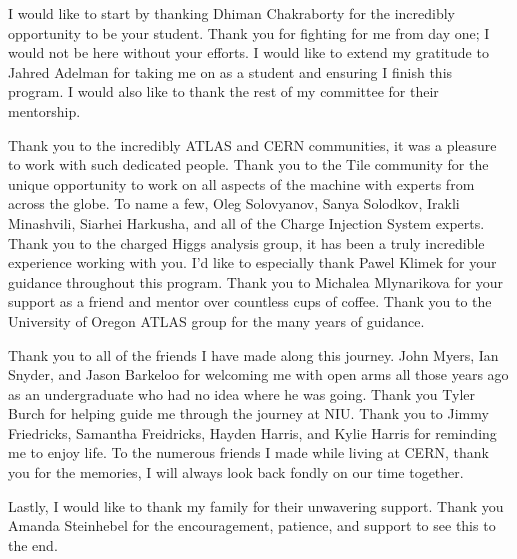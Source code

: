 I would like to start by thanking Dhiman Chakraborty for the incredibly opportunity to be your student. Thank you for fighting for me from day one; I would not be here without your efforts. I would like to extend my gratitude to Jahred Adelman for taking me on as a student and ensuring I finish this program. I would also like to thank the rest of my committee for their mentorship. 

Thank you to the incredibly ATLAS and CERN communities, it was a pleasure to work with such dedicated people. Thank you to the Tile community for the unique opportunity to work on all aspects of the machine with experts from across the globe. To name a few, Oleg Solovyanov, Sanya Solodkov, Irakli Minashvili, Siarhei Harkusha, and all of the Charge Injection System experts. Thank you to the charged Higgs analysis group, it has been a truly incredible experience working with you. I'd like to especially thank Pawel Klimek for your guidance throughout this program. Thank you to Michalea Mlynarikova for your support as a friend and mentor over countless cups of coffee. Thank you to the University of Oregon ATLAS group for the many years of guidance.

Thank you to all of the friends I have made along this journey. John Myers, Ian Snyder, and Jason Barkeloo for welcoming me with open arms all those years ago as an undergraduate who had no idea where he was going. Thank you Tyler Burch for helping guide me through the journey at NIU. Thank you to Jimmy Friedricks, Samantha Freidricks, Hayden Harris, and Kylie Harris for reminding me to enjoy life. To the numerous friends I made while living at CERN, thank you for the memories, I will always look back fondly on our time together. 

Lastly, I would like to thank my family for their unwavering support. Thank you Amanda Steinhebel for the encouragement, patience, and support to see this to the end.